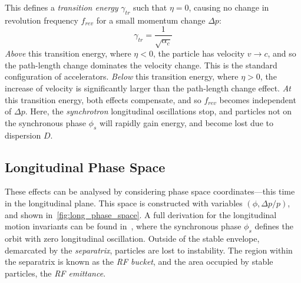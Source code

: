 \documentclass[11pt]{report}
\begin{document}
This defines a \textit{transition energy} $\gamma_{tr}$ such that $\eta=0$, causing no change in revolution frequency $f_{rev}$ for a small momentum change $\Delta p$:
\begin{equation}
  \gamma_{tr}=\frac 1{\sqrt{\alpha_c}}
\end{equation}
\textit{Above} this transition energy, where $\eta<0$, the particle has velocity $v\rightarrow c$, and so the path-length change dominates the velocity change. This is the standard configuration of accelerators.
\textit{Below} this transition energy, where $\eta >0$, the increase of velocity is significantly larger than the path-length change effect.
\textit{At} this transition energy, both effects compensate, and so $f_{rev}$ becomes independent of $\Delta p$. Here, the \textit{synchrotron} longitudinal oscillations stop, and particles not on the synchronous phase $\phi_s$ will rapidly gain energy, and become lost due to dispersion $D$.


\subsection{Longitudinal Phase Space}

These effects can be analysed by considering phase space coordinates---this time in the longitudinal plane. This space is constructed with variables $(\phi , \Delta p/p)$, and shown in~\autoref{fig:long_phase_space}. A full derivation for the longitudinal motion invariants can be found in~\cite{lbd:tecker}, where the synchronous phase $\phi_s$ defines the orbit with zero longitudinal oscillation. Outside of the stable envelope, demarcated by the \textit{separatrix}, particles are lost to instability. The region within the separatrix is known as the \textit{RF bucket}, and the area occupied by stable particles, the \textit{RF emittance}.
\end{document}

